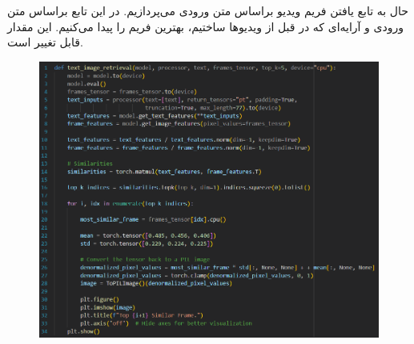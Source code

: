 \documentclass[12pt]{article}
\begin{document}
	\section{}
	حال به تابع یافتن فریم ویدیو براساس متن ورودی می‌پردازیم. در این تابع براساس متن ورودی و آرایه‌ای که در قبل از ویدیو‌ها ساختیم، بهترین  فریم را پیدا می‌کنیم.  این مقدار قابل تغییر است.
	\begin{figure}[H]
		\centering
		\includegraphics[width=0.9\linewidth]{pic_20}
	\end{figure} 
\end{document}
